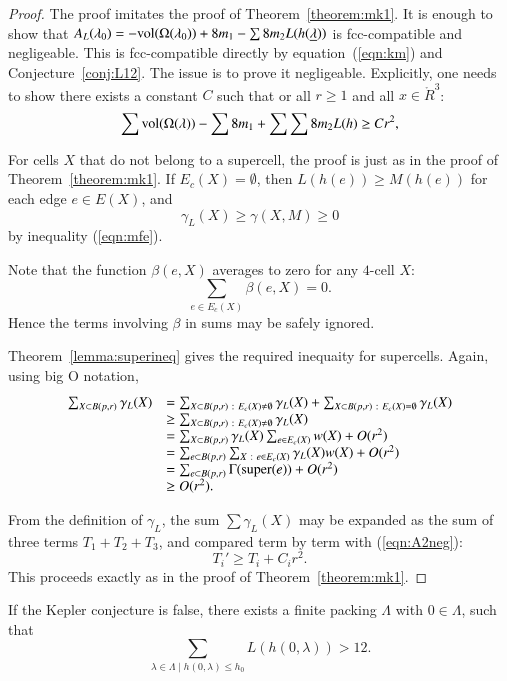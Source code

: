 \begin{proof}  The proof imitates the proof of Theorem~\ref{theorem:mk1}.
It is enough to show that $A_L(\lambda_0)  = -{\operatorname{vol}}(\Omega(\lambda_0)) + 8 m_1 - \sum 8 m_2 L(h({\underline{\lambda}}))$ is fcc-compatible and negligeable. 
This is fcc-compatible directly
by equation~(\ref{eqn:km})
and Conjecture~\ref{conj:L12}.  The issue is to prove it negligeable.  Explicitly, one needs
to show there exists a constant  $C$ such that or all $r\ge 1$ and all $x\in\ring{R}^3$:
\begin{equation}\label{eqn:A2neg}
  \sum {\operatorname{vol}}(\Omega(\lambda)) -\sum 8m_1 + \sum \sum 8 m_2 L(h) \ge C r^2,
\end{equation}

For cells $X$ that do not belong to a supercell,
the proof is just as in the proof of Theorem~\ref{theorem:mk1}.
If $E_c(X)=\emptyset$, then 
$L(h(e))\ge M(h(e))$ for each edge $e\in E(X)$, and
$$\gamma_L(X)\ge \gamma(X,M)\ge 0$$ 
by inequality (\ref{eqn:mfe}).

Note that the function $\beta(e,X)$ averages to zero for any $4$-cell $X$:
$$
\sum_{e\in E_c(X)} \beta(e,X) = 0.
$$
Hence the terms involving $\beta$ in sums may be safely ignored.

Theorem~\ref{lemma:superineq} gives the required inequaity for supercells.
Again, using big O notation, 
$$
\begin{array}{lll}
\sum_{X\subset B(p,r)} \gamma_L(X) &= 
\sum_{X\subset B(p,r)\ :\  E_c(X)\ne\emptyset} \gamma_L(X) +
\sum_{X\subset B(p,r)\ :\  E_c(X)=\emptyset} \gamma_L(X) \\
&\ge \sum_{X\subset B(p,r)\ :\  E_c(X)\ne\emptyset} \gamma_L(X) \\
&=\sum_{X\subset B(p,r)}\gamma_L(X)\sum_{e \in E_c(X)}w(X) + O(r^2)\\
&=\sum_{e\subset B(p,r)}\sum_{X\ :\  e \in E_c(X)}\gamma_L(X)w(X) + O(r^2)\\
&=\sum_{e\subset B(p,r)}\Gamma({\operatorname{super}}(e)) + O(r^2)\\
&\ge O(r^2).
\end{array}
$$

From the definition of $\gamma_L$, the sum $\sum \gamma_L(X)$ may be expanded as the sum of three terms $T_1+T_2+T_3$, and compared term by term with (\ref{eqn:A2neg}):
$$
T_i' \ge T_i + C_i r^2.
$$
This proceeds exactly as in the proof of Theorem~\ref{theorem:mk1}.
\end{proof}

\begin{corollary}\label{cor:CE} If the Kepler conjecture is false,
there exists a finite packing $\Lambda$ with $0\in\Lambda$, such
that
\begin{equation}\label{eqn:CE}
\sum_{\lambda\in\Lambda \mid h(0,\lambda)\le h_0} L(h(0,\lambda)) > 12.
\end{equation}
\end{corollary}

